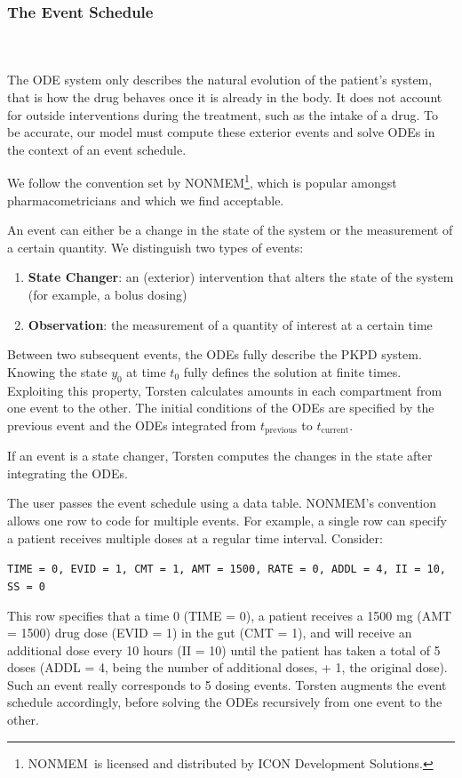 \documentclass[11pt]{amsart}
\begin{document}
\subsubsection{The Event Schedule} \ \\ \ \\
The ODE system only describes the natural evolution of the patient's system, that is how the drug behaves once it is already in the body. It does not account for outside interventions during the treatment, such as the intake of a drug. To be accurate, our model must compute these exterior events and solve ODEs in the context of an event schedule.

We follow the convention set by NONMEM\textregistered\footnote{NONMEM\textregistered\ is licensed and distributed by ICON Development Solutions.}, which is popular amongst pharmacometricians and which we find acceptable.

An event can either be a change in the state of the system or the measurement of a certain quantity. We distinguish two types of events:
\begin{enumerate}
  \item \textbf{State Changer}: an (exterior) intervention that alters the state of the system (for example, a bolus dosing)
  \item \textbf{Observation}: the measurement of a quantity of interest at a certain time
\end{enumerate}

Between two subsequent events, the ODEs fully describe the PKPD system. Knowing the state $y_0$ at time $t_0$ fully defines the solution at finite times. Exploiting this property, Torsten calculates amounts in each compartment from one event to the other. The initial conditions of the ODEs are specified by the previous event and the ODEs integrated from $t_{\mathrm{previous}}$ to $t_{\mathrm{current}}$.

If an event is a state changer, Torsten computes the changes in the state after integrating the ODEs.

The user passes the event schedule using a data table. NONMEM's convention allows one row to code for multiple events. For example, a single row can specify a patient receives multiple doses at a regular time interval. Consider:

\texttt{TIME = 0, EVID = 1, CMT = 1, AMT = 1500, RATE = 0, ADDL = 4, II = 10, SS = 0}

This row specifies that a time 0 (TIME = 0), a patient receives a 1500 mg (AMT = 1500) drug dose (EVID = 1) in the gut (CMT = 1), and will receive an additional dose every 10 hours (II = 10) until the patient has taken a total of 5 doses (ADDL = 4, being the number of additional doses, + 1, the original dose). Such an event really corresponds to 5 dosing events. Torsten augments the event schedule accordingly, before solving the ODEs recursively from one event to the other.
\end{document}

